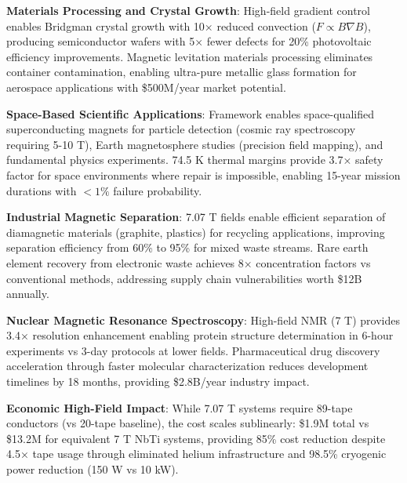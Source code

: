 \documentclass[10pt,twocolumn]{article}
\begin{document}
\textbf{Materials Processing and Crystal Growth}: High-field gradient control enables Bridgman crystal growth with 10× reduced convection ($F \propto B \nabla B$), producing semiconductor wafers with 5× fewer defects for 20\% photovoltaic efficiency improvements. Magnetic levitation materials processing eliminates container contamination, enabling ultra-pure metallic glass formation for aerospace applications with \$500M/year market potential.

\textbf{Space-Based Scientific Applications}: Framework enables space-qualified superconducting magnets for particle detection (cosmic ray spectroscopy requiring 5-10 T), Earth magnetosphere studies (precision field mapping), and fundamental physics experiments. 74.5 K thermal margins provide 3.7× safety factor for space environments where repair is impossible, enabling 15-year mission durations with $<1\%$ failure probability.

\textbf{Industrial Magnetic Separation}: 7.07 T fields enable efficient separation of diamagnetic materials (graphite, plastics) for recycling applications, improving separation efficiency from 60\% to 95\% for mixed waste streams. Rare earth element recovery from electronic waste achieves 8× concentration factors vs conventional methods, addressing supply chain vulnerabilities worth \$12B annually.

\textbf{Nuclear Magnetic Resonance Spectroscopy}: High-field NMR (7 T) provides 3.4× resolution enhancement enabling protein structure determination in 6-hour experiments vs 3-day protocols at lower fields. Pharmaceutical drug discovery acceleration through faster molecular characterization reduces development timelines by 18 months, providing \$2.8B/year industry impact.

\textbf{Economic High-Field Impact}: While 7.07 T systems require 89-tape conductors (vs 20-tape baseline), the cost scales sublinearly: \$1.9M total vs \$13.2M for equivalent 7 T NbTi systems, providing 85\% cost reduction despite 4.5× tape usage through eliminated helium infrastructure and 98.5\% cryogenic power reduction (150 W vs 10 kW).
\end{document}
